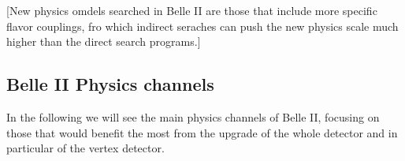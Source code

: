 [New physics omdels searched in Belle II are those that include more specific flavor couplings, fro which indirect seraches can push the new physics scale much higher than the direct search programs.]


\subsection{Belle II Physics channels}

In the following we will see the main physics channels of Belle II, focusing on those that would benefit the most from the upgrade of the whole detector and in particular of the vertex detector.\\

\hspace{.2cm}

